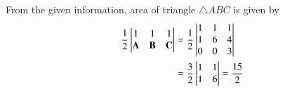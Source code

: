 From the given information, 
area of triangle $\triangle ABC$  is given by 
\begin{align}
\label{eq}
\frac{1}{2}  
\begin{vmatrix}1 & 1 & 1 \\ \mathbf{A} & \mathbf{B} & \mathbf{C}\end{vmatrix}
&= \frac{1}{2}  \begin{vmatrix}1 & 1 & 1 \\ 1 & 6 & 4 \\ 0 & 0 & 3\end{vmatrix}\\
&= \frac{3}{2}\begin{vmatrix}1 & 1\\ 1 & 6\end{vmatrix}
 =\frac{15}{2}
\end{align}

